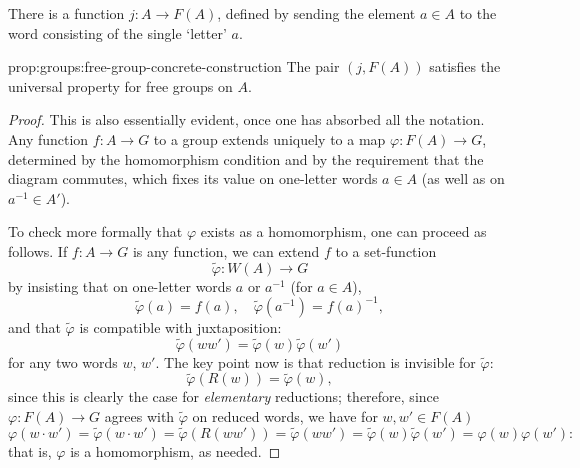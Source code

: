There is a function $j : A \to F(A)$, defined by sending the element
$a \in A$ to the word consisting of the single `letter' $a$.

\begin{prop}{}{prop:groups:free-group-concrete-construction}
  The pair $(j, F(A))$ satisfies the universal property for
    free groups on $A$.
\end{prop}
\begin{proof}
  This is also essentially evident, once one has absorbed all the
  notation.  Any function $f : A \to G$ to a group extends uniquely to
  a map $\varphi : F(A) \to G$, determined by the homomorphism
  condition and by the requirement that the diagram commutes, which
  fixes its value on one-letter words $a \in A$ (as well as on
  $a^{-1} \in A'$).

  To check more formally that $\varphi$ exists as a homomorphism, one
  can proceed as follows. If $f : A \to G$ is any function, we can
  extend $f$ to a set-function
  \[
    \tilde\varphi : W(A) \to G
  \]
  by insisting that on one-letter words $a$ or $a^{-1}$ (for
  $a \in A$),
  \[
    \tilde\varphi(a) = f(a), \quad \tilde\varphi(a^{-1}) = f(a)^{-1},
  \]
  and that $\tilde\varphi$ is compatible with juxtaposition:
  \[
    \tilde\varphi(ww') = \tilde\varphi(w)\tilde\varphi(w')
  \]
  for any two words $w$, $w'$. The key point now is that reduction is
  invisible for $\tilde\varphi$:
  \[
    \tilde\varphi(R(w)) = \tilde\varphi(w),
  \]
  since this is clearly the case for \emph{elementary} reductions;
  therefore, since $\varphi : F(A) \to G$ agrees with $\tilde\varphi$
  on reduced words, we have for $w, w' \in F(A)$
  \[
    \varphi(w \cdot w') = \tilde\varphi(w \cdot w') =
    \tilde\varphi(R(ww')) = \tilde\varphi(ww') =
    \tilde\varphi(w)\tilde\varphi(w') = \varphi(w)\varphi(w'):
  \]
  that is, $\varphi$ is a homomorphism, as needed.
\end{proof}


